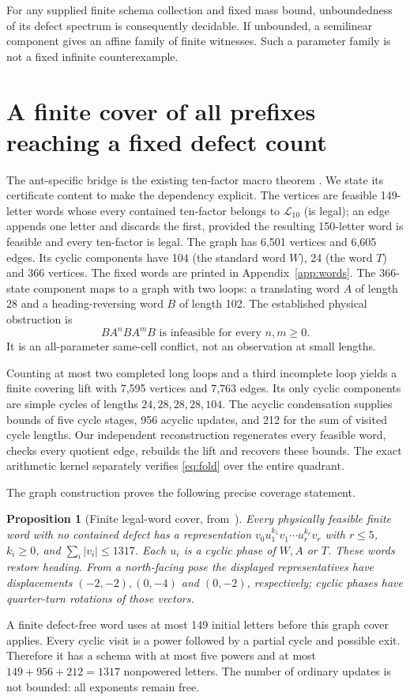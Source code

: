 \documentclass[11pt]{article}
\newtheorem{proposition}[theorem]{Proposition}
\theoremstyle{remark}\newtheorem{remark}[theorem]{Remark}
\begin{document}
For any supplied finite schema collection and fixed mass bound, unboundedness
of its defect spectrum is consequently decidable. If unbounded, a semilinear
component gives an affine family of finite witnesses. Such a parameter family
is not a fixed infinite counterexample.

\section{A finite cover of all prefixes reaching a fixed defect count}\label{sec:cover}
The ant-specific bridge is the existing ten-factor macro theorem
\cite{project}. We state its certificate content to make the dependency explicit.
The vertices are feasible 149-letter words whose every contained ten-factor
belongs to $\mathcal L_{10}$ (is legal); an edge appends one letter
and discards the first, provided the resulting 150-letter word is feasible
and every ten-factor is legal. The graph has 6,501 vertices and 6,605 edges. Its cyclic components have 104 (the standard word $W$), 24 (the word $T$) and 366 vertices.
The fixed words are printed in Appendix~\ref{app:words}. The 366-state
component maps to a graph with two loops: a translating word
$A$ of length 28 and a heading-reversing word $B$ of length 102. The established
physical obstruction is
\begin{equation}\label{eq:fold}
 BA^nBA^mB\text{ is infeasible for every }n,m\ge0.
\end{equation}
It is an all-parameter same-cell conflict, not an observation at small lengths.

Counting at most two completed long loops and a third incomplete loop yields
a finite covering lift with 7,595 vertices and 7,763 edges. Its only cyclic
components are simple cycles of lengths $24,28,28,28,104$. The acyclic
condensation supplies bounds of five cycle stages, 956 acyclic updates, and
212 for the sum of visited cycle lengths. Our independent reconstruction
regenerates every feasible word, checks every quotient edge, rebuilds the lift
and recovers these bounds. The exact arithmetic kernel separately verifies
\eqref{eq:fold} over the entire quadrant.

The graph construction proves the following precise coverage statement.
\begin{proposition}[Finite legal-word cover, from~\cite{project}]\label{prop:cover}
Every physically feasible finite word with no contained defect has a
representation $v_0u_1^{k_1}v_1\cdots u_r^{k_r}v_r$ with $r\le5$,
$k_i\ge0$, and $\sum_i|v_i|\le1317$. Each $u_i$ is a cyclic phase of
$W,A$ or $T$. These words restore heading. From a north-facing pose the
displayed representatives have displacements $(-2,-2),(0,-4)$ and $(0,-2)$,
respectively; cyclic phases have quarter-turn rotations of those vectors.
\end{proposition}
A finite defect-free word uses at most 149 initial letters before this graph
cover applies. Every cyclic visit is a power followed by a partial cycle and
possible exit. Therefore it has a schema with at most five powers and at most
$149+956+212=1317$ nonpowered letters. The number of ordinary updates is not
bounded: all exponents remain free.
\end{document}
